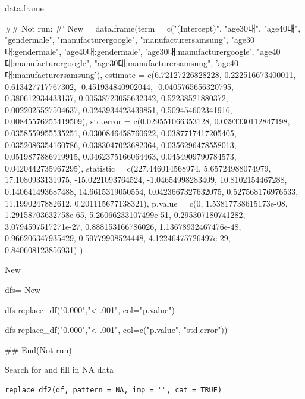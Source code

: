 \documentclass[a4paper]{book}
\begin{document}
%
\begin{Value}
data.frame
\end{Value}
%
\begin{Examples}
\begin{ExampleCode}

## Not run: 
#'
New = data.frame(term = c("(Intercept)", "age30대",
 "age40대", "gendermale", "manufacturergoogle",
 "manufacturersamsung",
 "age30대:gendermale", 'age40대:gendermale',
  'age30대:manufacturergoogle', "age40대:manufacturergoogle",
  "age30대:manufacturersamsung", 'age40대:manufacturersamsung'),
estimate = c(6.72127226828228, 0.222516673400011, 0.613427717767302,
 -0.451934840902044, -0.0405765656320795, 0.380612934433137,
  0.00538723055632342, 0.52238521880372, 0.0022025527504637,
  0.0243934423439851, 0.509454602341916, 0.00845576255419509),
std.error = c(0.029551066353128, 0.0393330112847198,
0.0358559955535251, 0.0300846458760622, 0.0387717417205405,
 0.0352086354160786, 0.0383047023682364, 0.0356296478558013,
 0.0519877886919915, 0.0462375166064463,
 0.0454909790784573, 0.0420442735967295),
statistic = c(227.446014568974, 5.65724988074979,
 17.1080933131975, -15.0221093764524, -1.04654998283409,
 10.8102154467288, 0.140641493687488, 14.6615319050554,
  0.0423667327632075, 0.527568176976533,
   11.1990247882612, 0.201115677138321),
p.value = c(0, 1.53817738615173e-08, 1.29158703632758e-65,
5.26066233107499e-51, 0.295307180741282, 3.0794597517271e-27,
 0.888153166786026, 1.13678932467476e-48,
 0.966206347935429, 0.59779908524448,
 4.12246475726497e-29, 0.840608123856931)
)%

New

dfs= New%

dfs%
  replace_df("0.000","< .001", col="p.value")

dfs%
  replace_df("0.000","< .001", col=c("p.value", "std.error"))



## End(Not run)


\end{ExampleCode}
\end{Examples}
%
\begin{Description}
Search for and fill in NA data
\end{Description}
%
\begin{Usage}
\begin{verbatim}
replace_df2(df, pattern = NA, imp = "", cat = TRUE)
\end{verbatim}
\end{Usage}
\end{document}
